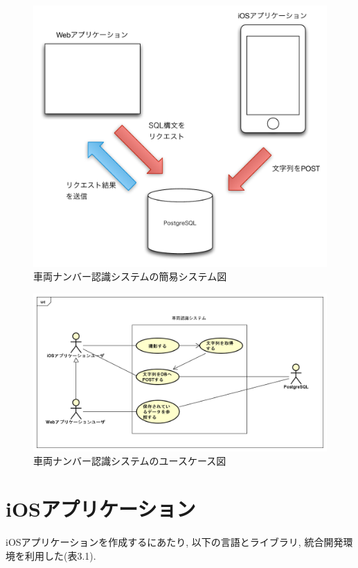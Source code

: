 \begin{figure}
\begin{center}
\includegraphics[width=16cm]{fig/system.pdf}
\end{center}
\caption{車両ナンバー認識システムの簡易システム図}
\end{figure}

\begin{figure}
\begin{center}
\includegraphics[width=16cm]{fig/usecase_system.png}
\end{center}
\caption{車両ナンバー認識システムのユースケース図}
\end{figure}

\section{iOSアプリケーション}
iOSアプリケーションを作成するにあたり, 以下の言語とライブラリ, 統合開発環境を利用した(表3.1).

